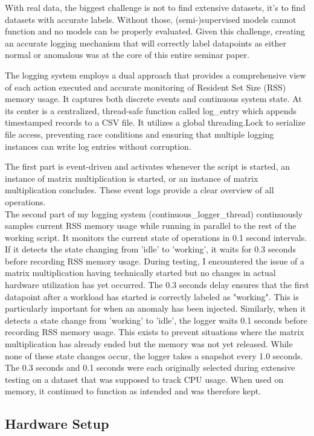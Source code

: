 \documentclass[12pt,oneside]{article}
\begin{document}
With real data, the biggest challenge is not to find extensive datasets, it's to find datasets with accurate labels. Without those, (semi-)supervised models cannot function and no models can be properly evaluated. Given this challenge, creating an accurate logging mechanism that will correctly label datapoints as either normal or anomalous was at the core of this entire seminar paper. \par
The logging system employs a dual approach that provides a comprehensive view of each action executed and accurate monitoring of Resident Set Size (RSS) memory usage. It captures both discrete events and continuous system state. At its center is a centralized, thread-safe function called log\_entry which appends timestamped records to a CSV file. It utilizes a global threading.Lock to serialize file access, preventing race conditions and ensuring that multiple logging instances can write log entries without corruption. \par
The first part is event-driven and activates whenever the script is started, an instance of matrix multiplication is started, or an instance of matrix multiplication concludes. These event logs provide a clear overview of all operations. \\
The second part of my logging system (continuous\_logger\_thread) continuously samples current RSS memory usage while running in parallel to the rest of the working script. It monitors the current state of operations in 0.1 second intervals. If it detects the state changing from 'idle' to 'working', it waits for 0.3 seconds before recording RSS memory usage. During testing, I encountered the issue of a matrix multiplication having technically started but no changes in actual hardware utilization has yet occurred. The 0.3 seconds delay ensures that the first datapoint after a workload has started is correctly labeled as "working". This is particularly important for when an anomaly has been injected. Similarly, when it detects a state change from 'working' to 'idle', the logger waits 0.1 seconds before recording RSS memory usage. This exists to prevent situations where the matrix multiplication has already ended but the memory was not yet released. While none of these state changes occur, the logger takes a snapshot every 1.0 seconds. The 0.3 seconds and 0.1 seconds were each originally selected during extensive testing on a dataset that was supposed to track CPU usage. When used on memory, it continued to function as intended and was therefore kept.

\subsection{Hardware Setup}
\end{document}
